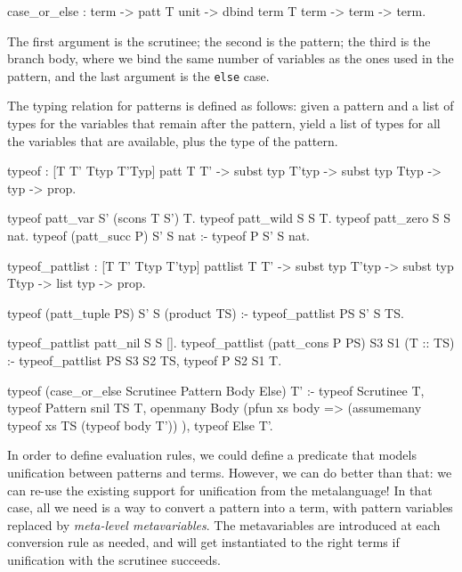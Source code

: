 \documentclass[format=acmlarge,review,anonymous]{acmart}\settopmatter{printfolios=true}
\begin{document}
\begin{codequote}
case_or_else : term -> patt T unit -> dbind term T term -> term -> term.
\end{codequote}

The first argument is the scrutinee; the second is the pattern; the third is the branch body, where
we bind the same number of variables as the ones used in the pattern, and the last argument is the
\texttt{else} case.

The typing relation for patterns is defined as follows: given a pattern and a list of types for the
variables that remain after the pattern, yield a list of types for all the variables that are
available, plus the type of the pattern.

\begin{codequote}
typeof : [T T' Ttyp T'Typ] patt T T' -> subst typ T'typ -> subst typ Ttyp -> typ -> prop.

typeof patt_var S' (scons T S') T.
typeof patt_wild S S T.
typeof patt_zero S S nat.
typeof (patt_succ P) S' S nat :-
  typeof P S' S nat.

typeof_pattlist :
  [T T' Ttyp T'typ] pattlist T T' -> subst typ T'typ -> subst typ Ttyp -> list typ -> prop.

typeof (patt_tuple PS) S' S (product TS) :-
  typeof_pattlist PS S' S TS.

typeof_pattlist patt_nil S S [].
typeof_pattlist (patt_cons P PS) S3 S1 (T :: TS) :-
  typeof_pattlist PS S3 S2 TS, typeof P S2 S1 T.

typeof (case_or_else Scrutinee Pattern Body Else) T' :-
  typeof Scrutinee T,
  typeof Pattern snil TS T,
  openmany Body (pfun xs body =>
     (assumemany typeof xs TS (typeof body T'))
  ),
  typeof Else T'.
\end{codequote}

In order to define evaluation rules, we could define a predicate that models unification between
patterns and terms. However, we can do better than that: we can re-use the existing support for
unification from the metalanguage! In that case, all we need is a way to convert a pattern into a
term, with pattern variables replaced by \emph{meta-level metavariables}. The metavariables are
introduced at each conversion rule as needed, and will get instantiated to the right terms if
unification with the scrutinee succeeds.
\end{document}
